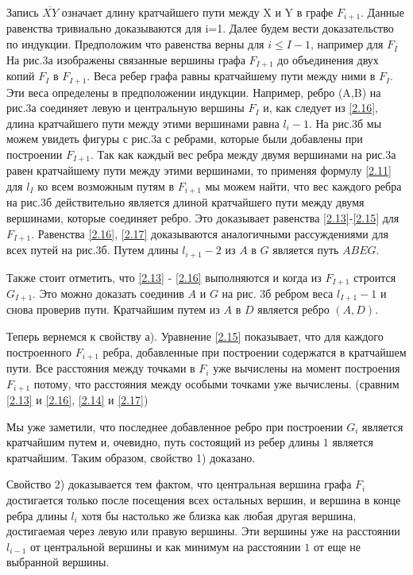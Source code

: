 \documentclass[a4paper, 14pt]{extarticle}
\begin{document}
Запись $\overline {XY}$ означает длину кратчайшего пути между X и Y в графе $F_{i+1}$. Данные равенства тривиально доказываются для i=1. Далее будем вести доказательство по индукции. Предположим что равенства верны для $i \leq I-1$, например для $F_I$ На рис.3а изображены связанные вершины графа $F_{I+1}$ до объединения двух копий $F_I$ в $F_{I+1}$. Веса ребер графа равны кратчайшему пути между ними в $F_I$. Эти веса определены в предположении индукции. Например, ребро (A,B) на рис.3а соединяет левую и центральную вершины $F_I$ и, как следует из \eqref{2.16}, длина кратчайшего пути между этими вершинами равна $l_i-1$. На рис.3б мы можем увидеть фигуры с рис.3а с ребрами, которые были добавлены при построении $F_{I+1}$. Так как каждый вес ребра между двумя вершинами на рис.3а равен кратчайшему пути между этими вершинами, то применяя формулу \eqref{2.11} для $l_I$ ко всем возможным путям в $F_{i+1}$ мы можем найти, что вес каждого ребра на рис.3б  действительно является длиной кратчайшего пути между двумя вершинами, которые соединяет ребро. Это доказывает равенства \ref{2.13}-\ref{2.15} для $F_{I+1}$. Равенства \ref{2.16}, \ref{2.17} доказываются аналогичными рассуждениями для всех путей на рис.3б. Путем длины $l_{i+1}-2$ из $A$ в $G$ является путь $ABEG$.

Также стоит отметить, что  \ref{2.13} - \ref{2.16} выполняются и когда из $F_{I+1}$ строится $G_{I+1}$. Это можно доказать соединив $A$ и $G$ на рис. 3б ребром веса $l_{I+1}-1$ и снова проверив пути. Кратчайшим путем из $A$ в $D$ является ребро $(A,D)$.

Теперь вернемся к свойству а). Уравнение \eqref{2.15} показывает, что для каждого построенного $F_{i+1}$ ребра, добавленные при построении содержатся в кратчайшем пути. Все расстояния между точками в $F_i$ уже вычислены на момент построения $F_{i+1}$ потому, что расстояния между особыми точками уже вычислены. (сравним \eqref{2.13} и \eqref{2.16}, \eqref{2.14} и \eqref{2.17})

Мы уже заметили, что последнее добавленное ребро при построении $G_i$ является кратчайшим путем и, очевидно, путь состоящий из ребер длины $1$ является кратчайшим. Таким образом, свойство 1) доказано.

Свойство 2) доказывается тем фактом, что центральная вершина графа $F_i$ достигается только после посещения всех остальных вершин, и вершина в конце ребра длины $l_i$ хотя бы настолько же близка как любая другая вершина, достигаемая через левую или правую вершины. Эти вершины уже на расстоянии $l_{i-1}$ от центральной вершины и как минимум на расстоянии $1$ от еще не выбранной вершины. \\
\end{document}
